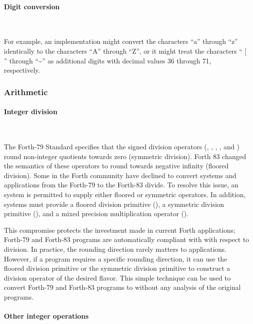 \setcounter{paragraph}{1}
\paragraph{Digit conversion} ~ %

For example, an implementation might convert the characters ``a''
through ``z'' identically to the characters ``A'' through ``Z'', or
it might treat the characters `` [ '' through ``\~{}'' as additional
digits with decimal values 36 through 71, respectively.


\subsubsection{Arithmetic} %

\paragraph{Integer division} ~ %

The Forth-79 Standard specifies that the signed division operators
(\word{/}, , , , and \word{*/})
round non-integer quotients towards zero (symmetric division).
Forth 83 changed the semantics of these operators to round towards
negative infinity (floored division). Some in the Forth community
have declined to convert systems and applications from the Forth-79
to the Forth-83 divide.  To resolve this issue, an  system
is permitted to supply either floored or symmetric operators. In
addition,  systems must provide a floored division primitive
(), a symmetric division primitive (), and
a mixed precision multiplication operator ().

This compromise protects the investment made in current Forth
applications; Forth-79 and Forth-83 programs are automatically
compliant with  with respect to division. In practice, the
rounding direction rarely matters to applications. However, if a
program requires a specific rounding direction, it can use the
floored division primitive  or the symmetric division
primitive  to construct a division operator of the
desired flavor. This simple technique can be used to convert Forth-79
and Forth-83 programs to  without any analysis of the
original programs.

\paragraph{Other integer operations} ~ %

